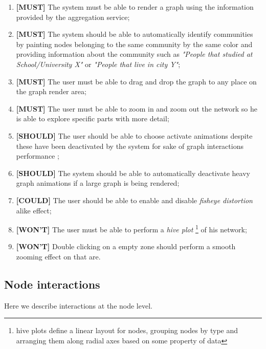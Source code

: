 \begin{enumerate}
    \item \textbf{[MUST]} The system must be able to render a graph using the information provided by the aggregation service;
    \item \textbf{[MUST]} The system should be able to automatically identify communities by painting nodes belonging to the same community by the same color and providing
    information about the community such as \textit{"People that studied at School/University X"} or \textit{"People that live in city Y"};
    \item \textbf{[MUST]} The user must be able to drag and drop the graph to any place on the graph render area;
    \item \textbf{[MUST]} The user must be able to zoom in and zoom out the network so he is able to explore specific parts with more detail;
    \item \textbf{[SHOULD]} The user should be able to choose activate animations despite these have been deactivated by the system for sake of graph interactions performance ;
    \item \textbf{[SHOULD]} The system should be able to automatically deactivate heavy graph animations if a large graph is being rendered;
    \item \textbf{[COULD]} The user should be able to enable and disable \textit{fisheye distortion} alike effect; %
    \item \textbf{[WON'T]} The user must be able to perform a \textit{hive plot} \footnote{hive plots define a linear layout for nodes, grouping nodes by type and arranging them along radial axes based on some property of data} of his network;
    \item \textbf{[WON'T]} Double clicking on a empty zone should perform a smooth zooming effect on that are. %
\end{enumerate}

\subsection{Node interactions}

Here we describe interactions at the node level.

